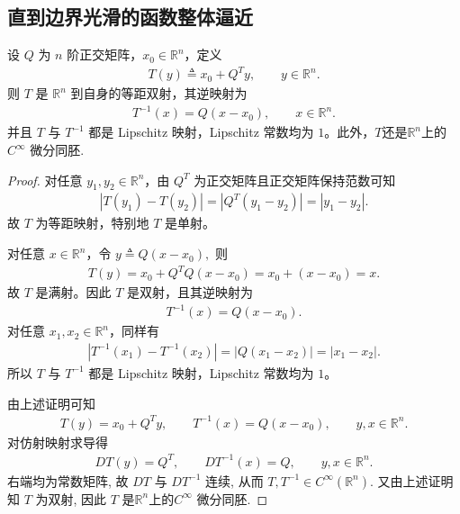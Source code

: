 \documentclass[../../main.tex]{subfiles}
\begin{document}
\subsection{直到边界光滑的函数整体逼近}\label{subsection:ch05-边界逼近}

\begin{lemma}[正交平移变换为等距双射]\label{lemma:正交平移变换为等距双射}
设 $Q$ 为 $n$ 阶正交矩阵，$x_0\in\mathbb{R}^n$，定义
\begin{align*}
T(y)\triangleq x_0+Q^T y,\qquad y\in\mathbb{R}^n.
\end{align*}
则 $T$ 是 $\mathbb{R}^n$ 到自身的等距双射，其逆映射为
\begin{align*}
T^{-1}(x)=Q(x-x_0),\qquad x\in\mathbb{R}^n.
\end{align*}
并且 $T$ 与 $T^{-1}$ 都是 Lipschitz 映射，Lipschitz 常数均为 $1$。此外，\(T\)还是$\mathbb{R}^n$上的\(C^\infty\) 微分同胚.
\end{lemma}
\begin{proof}

对任意 $y_1,y_2\in\mathbb{R}^n$，由 $Q^T$ 为正交矩阵且正交矩阵保持范数可知
\begin{align*}
|T(y_1)-T(y_2)|
=|Q^T(y_1-y_2)|
=|y_1-y_2|.
\end{align*}
故 $T$ 为等距映射，特别地 $T$ 是单射。

对任意 $x\in\mathbb{R}^n$，令
$y\triangleq Q(x-x_0),$
则
\begin{align*}
T(y)=x_0+Q^T Q(x-x_0)=x_0+(x-x_0)=x.
\end{align*}
故 $T$ 是满射。因此 $T$ 是双射，且其逆映射为
\begin{align*}
T^{-1}(x)=Q(x-x_0).
\end{align*}
对任意 $x_1,x_2\in\mathbb{R}^n$，同样有
\begin{align*}
|T^{-1}(x_1)-T^{-1}(x_2)|
=|Q(x_1-x_2)|
=|x_1-x_2|.
\end{align*}
所以 $T$ 与 $T^{-1}$ 都是 Lipschitz 映射，Lipschitz 常数均为 $1$。

由上述证明可知
\begin{align*}
T(y)=x_0+Q^T y,\qquad T^{-1}(x)=Q(x-x_0),\qquad y,x\in\mathbb R^n.
\end{align*}
对仿射映射求导得
\begin{align*}
DT(y)=Q^T,\qquad DT^{-1}(x)=Q,\qquad y,x\in\mathbb R^n.
\end{align*}
右端均为常数矩阵, 故 \(DT\) 与 \(DT^{-1}\) 连续, 从而 \(T,T^{-1}\in C^\infty(\mathbb R^n)\). 又由上述证明知 \(T\) 为双射, 因此 \(T\) 是$\mathbb{R}^n$上的\(C^\infty\) 微分同胚.
\end{proof}
\end{document}
